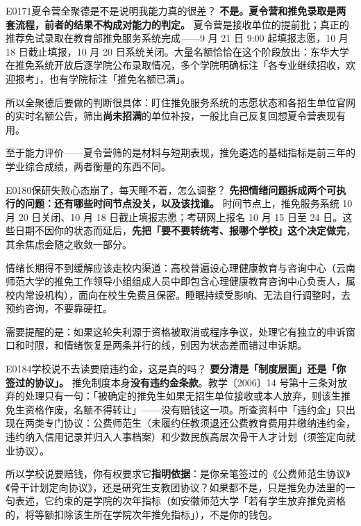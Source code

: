 \begin{qa}{E0171}{夏令营全聚德是不是说明我能力真的很差？}
\textbf{不是。夏令营和推免录取是两套流程，前者的结果不构成对能力的判定。}
夏令营是接收单位的提前批；真正的推荐免试录取在教育部推免服务系统完成——9 月 21 日 9:00 起填报志愿，10 月 18 日截止填报，10 月 20 日系统关闭。大量名额恰恰在这个阶段放出：东华大学在推免系统开放后逐学院公布录取情况，多个学院明确标注「各专业继续招收，欢迎报考」，也有学院标注「推免名额已满」。

所以全聚德后要做的判断很具体：盯住推免服务系统的志愿状态和各招生单位官网的实时名额公告，筛出\textbf{尚未招满}的单位补投，一般比自己反复回想夏令营表现有用。

至于能力评价——夏令营筛的是材料与短期表现，推免遴选的基础指标是前三年的学业综合成绩，两者衡量的东西不同。
\end{qa}

\begin{qa}{E0180}{保研失败心态崩了，每天睡不着，怎么调整？}
\textbf{先把情绪问题拆成两个可执行的问题：还有哪些时间节点没关，以及该找谁。}
时间节点上，推免服务系统 10 月 20 日关闭、10 月 18 日截止填报志愿；考研网上报名 10 月 15 日至 24 日。这些日期不因你的状态而延后，\textbf{先把「要不要转统考、报哪个学校」这个决定做完}，其余焦虑会随之收敛一部分。

情绪长期得不到缓解应该走校内渠道：高校普遍设心理健康教育与咨询中心（云南师范大学的推免工作领导小组组成人员中即包含心理健康教育咨询中心负责人，属校内常设机构），面向在校生免费且保密。睡眠持续受影响、无法自行调整时，去预约咨询，不要靠硬扛。

需要提醒的是：如果这轮失利源于资格被取消或程序争议，处理它有独立的申诉窗口和时限，和情绪恢复是两条并行的线，别因为状态差而错过申诉期。
\end{qa}

\begin{qa}{E0184}{学校说不去读要赔违约金，这是真的吗？}
\textbf{要分清是「制度层面」还是「你签过的协议」。}
推免制度本身\textbf{没有违约金条款}。教学〔2006〕14 号第十三条对放弃的处理只有一句：「被确定的推免生如果无招生单位接收或本人放弃，则该生推免生资格作废，名额不得转让」——没有赔钱这一项。所查资料中「违约金」只出现在两类专门协议：公费师范生（未履约任教须退还公费教育费用并缴纳违约金，违约纳入信用记录并归入人事档案）和少数民族高层次骨干人才计划（须签定向就业协议）。

所以学校说要赔钱，你有权要求它\textbf{指明依据}：是你亲笔签过的《公费师范生协议》《骨干计划定向协议》，还是研究生支教团协议？如果都不是，只是推免办法里的一句表述，它约束的是学院的次年指标（如安徽师范大学「若有学生放弃推免资格的，将等额扣除该生所在学院次年推免指标」），不是你的钱包。
\end{qa}

